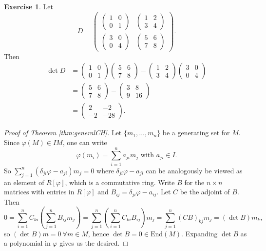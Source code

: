 \documentclass[a4paper]{article}
\newcommand{\End}{\text{End}}
\theoremstyle{definition}
\newtheorem{exe}[defn]{Exercise}
\begin{document}
\begin{exe}
Let
\[
D=\begin{pmatrix}
\begin{pmatrix}1&0\\0&1\end{pmatrix} & \begin{pmatrix}1&2\\3&4\end{pmatrix} \\ \begin{pmatrix}3&0\\0&4\end{pmatrix} & \begin{pmatrix}5&6\\7&8\end{pmatrix}
\end{pmatrix}.
\]
Then
\[
\begin{aligned}
\det D&=\begin{pmatrix}1&0\\0&1\end{pmatrix}\begin{pmatrix}5&6\\7&8\end{pmatrix}-\begin{pmatrix}1&2\\3&4\end{pmatrix}\begin{pmatrix}3&0\\0&4\end{pmatrix}\\
&=\begin{pmatrix}5&6\\7&8\end{pmatrix}-\begin{pmatrix}3&8\\9&16\end{pmatrix}\\
&=\begin{pmatrix}2&-2\\-2&-28\end{pmatrix}.
\end{aligned}
\]
\end{exe}

\begin{proof}[Proof of Theorem \ref{thm:generalCH}]
Let $\{m_1,\ldots,m_n\}$ be a generating set for $M$. Since $\varphi(M)\in IM$, one can write
\[
\varphi(m_i)=\sum_{i=1}^n a_{ji} m_j\text{ with }a_{ji}\in I.
\]
So $\sum_{j=1}^n(\delta_{ji}\varphi-a_{ji})m_j=0$ where $\delta_{ji}\varphi-a_{ji}$ can be analogously be viewed as an element of $R[\varphi]$, which is a commutative ring. Write $B$ for the $n\times n$ matrices with entries in $R[\varphi]$ and $B_{ij}=\delta_{ji}\varphi-a_{ij}$. Let $C$ be the adjoint of $B$. Then
\[
0=\sum_{i=1}^n C_{ki} \left(\sum_{j=1}^n B_{ij}m_j\right)=\sum_{j=1}^n \left(\sum_{i=1}^n C_{ki}B_{ij}\right)m_j=\sum_{j=1}^n (CB)_{kj} m_j=(\det B)m_k,
\]
so $(\det B)m=0 \ \forall m\in M$, hence $\det B=0\in \End(M)$. Expanding $\det B$ as a polynomial in $\varphi$ gives us the desired.
\end{proof}
\end{document}
